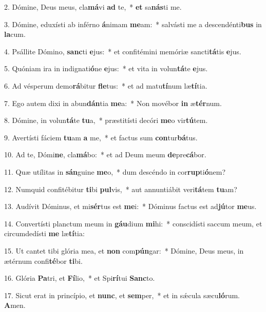 2. Dómine, Deus meus, cla\textbf{má}vi \textbf{ad} te,~*  \textbf{et} sa\textbf{nás}ti me.\

3. Dómine, eduxísti ab inférno \textbf{á}nimam \textbf{me}am:~*  salvásti me a descendénti\textbf{bus} in \textbf{la}cum.\

4. Psállite Dómino, \textbf{sanc}ti \textbf{e}jus:~*  et confitémini memóriæ sancti\textbf{tá}tis \textbf{e}jus.\

5. Quóniam ira in indignati\textbf{ó}ne \textbf{e}jus:~*  et vita in volun\textbf{tá}te \textbf{e}jus.\

6. Ad vésperum demo\textbf{rá}bitur \textbf{fle}tus:~*  et ad matu\textbf{tí}num læ\textbf{tí}tia.\

7. Ego autem dixi in abun\textbf{dán}tia \textbf{me}a:~*  Non movébor \textbf{in} æ\textbf{tér}num.\

8. Dómine, in volun\textbf{tá}te \textbf{tu}a,~*  præstitísti decóri \textbf{me}o vir\textbf{tú}tem.\

9. Avertísti fáciem \textbf{tu}am \textbf{a} me,~*  et factus sum \textbf{con}tur\textbf{bá}tus.\

10. Ad te, Dómi\textbf{ne}, cla\textbf{má}bo:~*  et ad Deum meum \textbf{de}pre\textbf{cá}bor.\

11. Quæ utílitas in \textbf{sán}guine \textbf{me}o,~*  dum descéndo in cor\textbf{rup}ti\textbf{ó}nem?\

12. Numquid confitébitur \textbf{ti}bi \textbf{pul}vis,~*  aut annuntiábit veri\textbf{tá}tem \textbf{tu}am?\

13. Audívit Dóminus, et mi\textbf{sér}tus est \textbf{me}i:~*  Dóminus factus est ad\textbf{jú}tor \textbf{me}us.\

14. Convertísti planctum meum in \textbf{gáu}dium \textbf{mi}hi:~*  conscidísti saccum meum, et circumdedísti \textbf{me} læ\textbf{tí}tia:\

15. Ut cantet tibi glória mea, et \textbf{non} com\textbf{pún}gar:~*  Dómine, Deus meus, in ætérnum confi\textbf{té}bor \textbf{ti}bi.\

16. Glória \textbf{Pa}tri, et \textbf{Fí}lio,~*  et Spi\textbf{rí}tui \textbf{Sanc}to.\

17. Sicut erat in princípio, et \textbf{nunc}, et \textbf{sem}per,~*  et in sǽcula sæcu\textbf{ló}rum. \textbf{A}men.\

